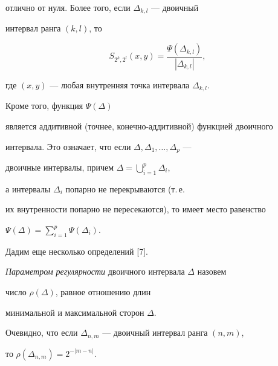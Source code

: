 отлично от нуля. Более того, если $\Delta _{k,l}$ --- двоичный


интервал ранга $(k,l)$, то 


\begin{equation}


S_{2^{k},2^{l}}(x,y)=\frac{\Psi (\Delta_{k,l})}{| \Delta_{k,l}| },


\end{equation}


где $(x,y)$ --- любая внутренняя точка интервала $\Delta _{k,l}$. 


Кроме того, функция $\Psi (\Delta)$


является аддитивной (точнее, конечно-аддитивной) функцией двоичного


интервала. Это означает, что если $\Delta,\Delta _{1},\dotsc,\Delta _{p}$ --- 


двоичные интервалы, причем $\Delta =\bigcup\limits _{i=1}^{p}\Delta _{i}$,


а интервалы $\Delta _{i}$ попарно не перекрываются (т.\,е.


их внутренности попарно не пересекаются), то имеет место равенство


$\Psi \left(\Delta \right) =\sum\limits _{i=1}^{p}\Psi (\Delta _{i})$.





Дадим еще несколько определений [7].





\begin{defn}


{\it Параметром регулярности} двоичного интервала $\Delta $ назовем


число $\rho (\Delta)$, равное отношению длин 


минимальной и максимальной сторон $\Delta$.


\end{defn}





Очевидно, что если $\Delta _{n,m}$ --- двоичный интервал ранга $(n,m)$,


то $\rho (\Delta _{n,m})=2^{-| m-n| }$.





